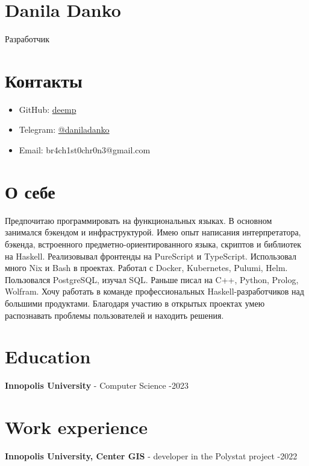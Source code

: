 \documentclass[twocolumn,11pt]{report}
\begin{document}
\section*{\huge Danila Danko}

Разработчик

\section*{Контакты}
\begin{itemize}
     \itemsep0em
     \item GitHub: \href{https://github.com/deemp}{deemp}
     \item Telegram: \href{https://t.me/daniladanko}{@daniladanko}
     \item Email: br4ch1st0chr0n3@gmail.com
\end{itemize}

\section*{О себе}

Предпочитаю программировать на функциональных языках.
В основном занимался бэкендом и инфраструктурой.
Имею опыт написания интерпретатора, бэкенда, встроенного предметно-ориентированного языка, скриптов и библиотек на Haskell.
Реализовывал фронтенды на PureScript и TypeScript.
Использовал много Nix и Bash в проектах.
Работал с Docker, Kubernetes, Pulumi, Helm.
Пользовался PostgreSQL, изучал SQL.
Раньше писал на C++, Python, Prolog, Wolfram.
Хочу работать в команде профессиональных Haskell-разработчиков над большими продуктами.
Благодаря участию в открытых проектах умею распознавать проблемы пользователей и находить решения.

\section*{Education}

\textbf{Innopolis University} - Computer Science -2023

\section*{Work experience}

\textbf{Innopolis University, Center GIS} - developer in the Polystat project -2022

\newpage
\end{document}
